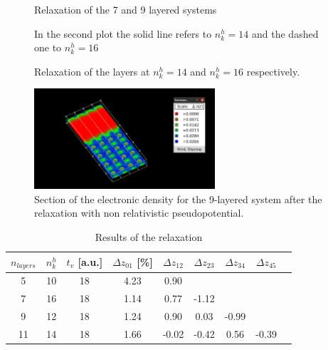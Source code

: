 \documentclass[a4paper, 11pt]{article}
\begin{document}
    \begin{figure}
      \centering
      \caption{Relaxation of the 7 and 9 layered systems}
      \label{fig:nl7-9r}
    \end{figure}

    \begin{figure}
      \centering
      \caption{In the second plot the solid line refers to $n_k^h = 14$ and the dashed one to $n_k^h = 16$}
      \label{fig:nl11}
    \end{figure}

    \begin{figure}
      \centering
      \caption{Relaxation of the layers at $n_k^h = 14$ and $n_k^h = 16$ respectively.}
      \label{fig:nl11r}
    \end{figure}

    \begin{figure}
      \centering
      \includegraphics[width=0.6\textwidth]{img/al-nl9-multi.png}
      \caption{Section of the electronic density for the 9-layered system after the relaxation with non relativistic pseudopotential.}
      \label{fig:nl9-rho}
    \end{figure}

    \begin{table}[H]
      \centering
      \begin{tabular}{ccccccccc}
        \toprule
        $n_{layers}$ & $n_k^h$ & $t_v$ [a.u.] & $\Delta z_{01}$ [\%] & $\Delta z_{12}$ & $\Delta z_{23}$ & $\Delta z_{34}$ & $\Delta z_{45}$ \\
        \midrule
        5  & 10 & 18 & 4.23 & 0.90 & & & \\
        7  & 16 & 18 & 1.14 & 0.77 & -1.12 & & \\
        9  & 12 & 18 & 1.24 & 0.90 & 0.03 & -0.99 & \\
        11 & 14 & 18 & 1.66 & -0.02 & -0.42 & 0.56 & -0.39 \\
        \bottomrule
      \end{tabular}
      \caption{Results of the relaxation}
      \label{tab:surface_results}
    \end{table}
\end{document}
